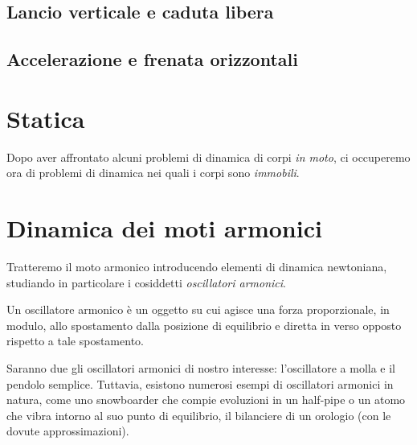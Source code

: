 \subsection{Lancio verticale e caduta libera}

\subsection{Accelerazione e frenata orizzontali}


\section{Statica}
Dopo aver affrontato alcuni problemi di dinamica di corpi \textit{in
moto}, ci occuperemo ora di problemi di dinamica nei quali i corpi
sono \textit{immobili}.


\section{Dinamica dei moti armonici}
Tratteremo il moto armonico introducendo elementi di dinamica newtoniana,
studiando in particolare i cosiddetti \textit{oscillatori armonici}.

\begin{tcolorbox}[colback = yellow!30, colframe = yellow!30!black, title = {Oscillatore armonico}]
    Un oscillatore armonico è un oggetto su cui agisce una forza proporzionale,
    in modulo, allo spostamento dalla posizione di equilibrio e diretta in
    verso opposto rispetto a tale spostamento.
\end{tcolorbox}

\noindent Saranno due gli oscillatori armonici di nostro interesse: l'oscillatore a
molla e il pendolo semplice. Tuttavia, esistono numerosi esempi di oscillatori
armonici in natura, come uno snowboarder che compie evoluzioni in un half-pipe o
un atomo che vibra intorno al suo punto di equilibrio, il bilanciere di un
orologio (con le dovute approssimazioni).



